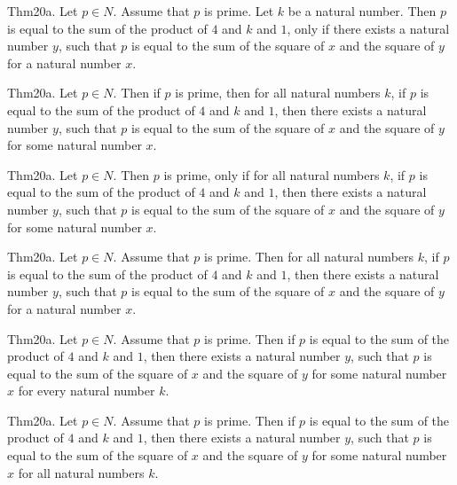 \documentclass{article}
\begin{document}
Thm20a. Let $p \in N$. Assume that $p$ is prime. Let $k$ be a natural number. Then $p$ is equal to the sum of the product of $4$ and $k$ and $1$, only if there exists a natural number $y$, such that $p$ is equal to the sum of the square of $x$ and the square of $y$ for a natural number $x$.

Thm20a. Let $p \in N$. Then if $p$ is prime, then for all natural numbers $k$, if $p$ is equal to the sum of the product of $4$ and $k$ and $1$, then there exists a natural number $y$, such that $p$ is equal to the sum of the square of $x$ and the square of $y$ for some natural number $x$.

Thm20a. Let $p \in N$. Then $p$ is prime, only if for all natural numbers $k$, if $p$ is equal to the sum of the product of $4$ and $k$ and $1$, then there exists a natural number $y$, such that $p$ is equal to the sum of the square of $x$ and the square of $y$ for some natural number $x$.

Thm20a. Let $p \in N$. Assume that $p$ is prime. Then for all natural numbers $k$, if $p$ is equal to the sum of the product of $4$ and $k$ and $1$, then there exists a natural number $y$, such that $p$ is equal to the sum of the square of $x$ and the square of $y$ for a natural number $x$.

Thm20a. Let $p \in N$. Assume that $p$ is prime. Then if $p$ is equal to the sum of the product of $4$ and $k$ and $1$, then there exists a natural number $y$, such that $p$ is equal to the sum of the square of $x$ and the square of $y$ for some natural number $x$ for every natural number $k$.

Thm20a. Let $p \in N$. Assume that $p$ is prime. Then if $p$ is equal to the sum of the product of $4$ and $k$ and $1$, then there exists a natural number $y$, such that $p$ is equal to the sum of the square of $x$ and the square of $y$ for some natural number $x$ for all natural numbers $k$.
\end{document}
